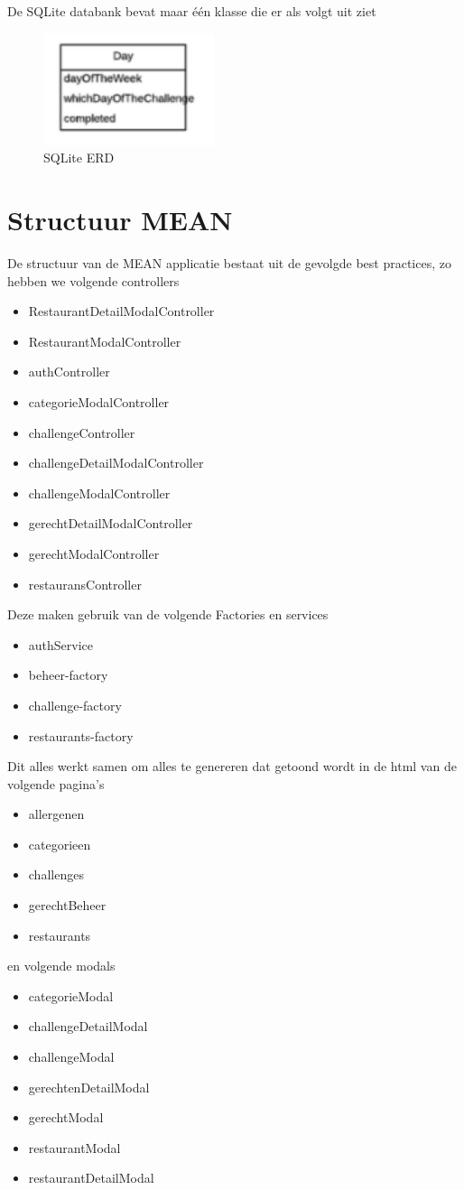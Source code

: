 De SQLite databank bevat maar één klasse die er als volgt uit ziet

\begin{figure}[H]
	\centering
	\includegraphics[width=5cm]{img/erd_sqlite.png}
	\caption{SQLite ERD}
\end{figure}

\section{Structuur MEAN}

De structuur van de MEAN applicatie bestaat uit de gevolgde best practices, zo hebben we volgende controllers

\begin{itemize}
\item RestaurantDetailModalController
\item RestaurantModalController
\item authController
\item categorieModalController
\item challengeController
\item challengeDetailModalController
\item challengeModalController
\item gerechtDetailModalController
\item gerechtModalController
\item restauransController
\end{itemize}

Deze maken gebruik van de volgende Factories en services


\begin{itemize}
	\item authService
	\item beheer-factory
	\item challenge-factory
	\item restaurants-factory
\end{itemize}

Dit alles werkt samen om alles te genereren dat getoond wordt in de html van de volgende pagina's

\begin{itemize}
	\item allergenen
	\item categorieen
	\item challenges
	\item gerechtBeheer
	\item restaurants
\end{itemize}

en volgende modals


\begin{itemize}
	\item categorieModal
	\item challengeDetailModal
	\item challengeModal
	\item gerechtenDetailModal
	\item gerechtModal
	\item restaurantModal
	\item restaurantDetailModal
\end{itemize}


